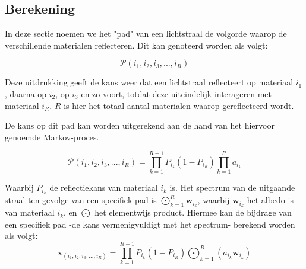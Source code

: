 \documentclass[12pt]{report}
\DeclareMathOperator*{\Odot}{\bigodot}
\begin{document}

\subsection{Berekening}

In deze sectie noemen we het "pad" van een lichtstraal de volgorde waarop de verschillende materialen reflecteren. Dit kan genoteerd worden als volgt:

\begin{equation}
\mathcal{P}(i_1,i_2,i_3,...,i_R)
\end{equation}

Deze uitdrukking geeft de kans weer dat een lichtstraal reflecteert op materiaal $i_1$, daarna op $i_2$, op $i_3$ en zo voort, totdat deze uiteindelijk interageren met materiaal $i_R$. $R$ is hier het totaal aantal materialen waarop gereflecteerd wordt.

De kans op dit pad kan worden uitgerekend aan de hand van het hiervoor genoemde Markov-proces\cite{mlinmix}. 

\begin{equation}
\mathcal{P}(i_1,i_2,i_3,...,i_R) = \prod_{k=1}^{R-1} P_{i_k} \left(1-P_{i_R}\right) \prod_{k=1}^R a_{i_k}
\end{equation}

Waarbij $P_{i_k}$ de reflectiekans van materiaal $i_k$ is. Het spectrum van de uitgaande straal ten gevolge van een specifiek pad is $\Odot_{k=1}^R \bm{w}_{i_k}$, waarbij $\bm{w}_{i_k}$ het albedo is van materiaal $i_k$, en $\Odot$ het elementwijs product. Hiermee kan de bijdrage van een specifiek pad -de kans vermenigvuldigt met het spectrum- berekend worden als volgt:
\begin{equation}
\bm{x}_{(i_1,i_2,i_3,...,i_R)} = \prod_{k=1}^{R-1} P_{i_k} \left(1-P_{i_R}\right) \Odot_{k=1}^R \left(a_{i_k} \bm{w}_{i_k}\right)
\end{equation}
\end{document}
